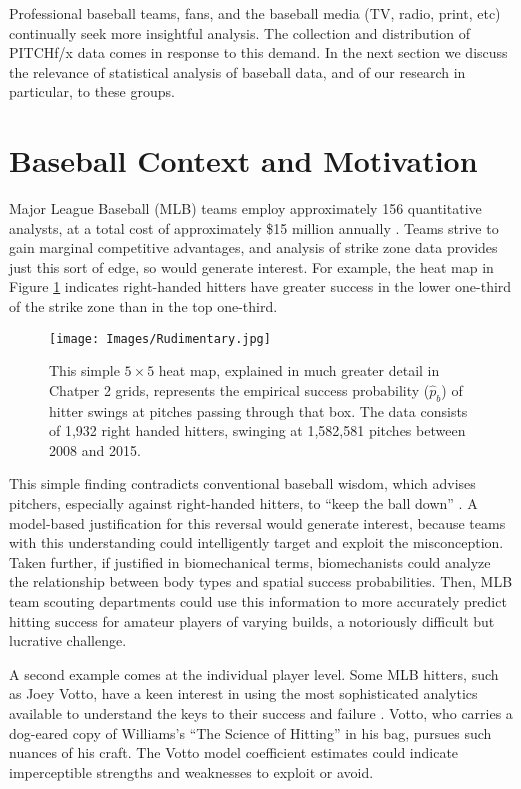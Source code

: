 Professional baseball teams, fans, and the baseball media (TV, radio, print, etc)  continually seek more insightful analysis. The collection and distribution of PITCHf/x\textsuperscript{\textregistered} data comes in response to this demand. In the next section we discuss the relevance of statistical analysis of baseball data, and of our research in particular, to these groups.

\section{Baseball Context and Motivation}

Major League Baseball (MLB\textsuperscript{\textregistered}) teams employ approximately 156 quantitative analysts, at a total cost of approximately \$15 million annually \citep{Lindbergh2016}. Teams strive to gain marginal competitive advantages, and analysis of strike zone data provides just this sort of edge, so would generate interest. For example, the heat map in Figure \ref{fig:jane} indicates right-handed hitters have greater success in the lower one-third of the strike zone than in the top one-third.
        \begin{figure}[H]
      	\centering
      	\texttt{[image: Images/Rudimentary.jpg]} 
      	\caption{This simple $5 \times 5$ heat map, explained in much greater detail in Chatper 2 grids, represents the empirical success probability ($\hat{p}_{b}$) of hitter swings at pitches passing through that box.  The data consists of 1,932 right handed hitters, swinging at 1,582,581 pitches between 2008 and 2015.}
      	\label{fig:jane}
      	\end{figure} 
This simple finding contradicts conventional baseball wisdom, which advises pitchers, especially against right-handed hitters, to ``keep the ball down'' \citep{Stallings2003}. A model-based justification for this reversal would generate interest, because teams with this understanding could intelligently target and exploit the misconception. Taken further, if justified in biomechanical terms, biomechanists could analyze the relationship between body types and spatial success probabilities. Then, MLB\textsuperscript{\textregistered} team scouting departments could use this information to more accurately predict hitting success for amateur players of varying builds, a notoriously difficult but lucrative challenge. 

A second example comes at the individual player level. Some MLB\textsuperscript{\textregistered} hitters, such as Joey Votto, have a keen interest in using the most sophisticated analytics available to understand the keys to their success and failure \citep{Daugherty2015}. Votto, who carries a dog-eared copy of Williams's ``The Science of Hitting'' in his bag, pursues such nuances of his craft. The Votto model coefficient estimates could indicate imperceptible strengths and weaknesses to exploit or avoid. 

